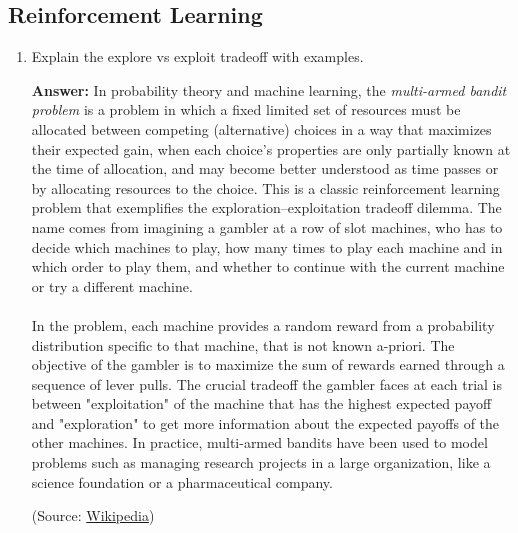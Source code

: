 \documentclass{article}
\newenvironment{QandA}{\begin{enumerate}[label=\arabic*.]}{\end{enumerate}}
\newenvironment{answer}{\par\normalfont \textbf{Answer:}}{}
\begin{document}
\subsection{Reinforcement Learning}
\begin{QandA}
    \item Explain the explore vs exploit tradeoff with examples.
    \begin{answer}
        In probability theory and machine learning, the \textit{multi-armed bandit problem} is a problem in which a fixed limited set of resources must be allocated between competing (alternative) choices in a way that maximizes their expected gain, when each choice's properties are only partially known at the time of allocation, and may become better understood as time passes or by allocating resources to the choice. This is a classic reinforcement learning problem that exemplifies the exploration–exploitation tradeoff dilemma. The name comes from imagining a gambler at a row of slot machines, who has to decide which machines to play, how many times to play each machine and in which order to play them, and whether to continue with the current machine or try a different machine.\\\\
        In the problem, each machine provides a random reward from a probability distribution specific to that machine, that is not known a-priori. The objective of the gambler is to maximize the sum of rewards earned through a sequence of lever pulls. The crucial tradeoff the gambler faces at each trial is between "exploitation" of the machine that has the highest expected payoff and "exploration" to get more information about the expected payoffs of the other machines. In practice, multi-armed bandits have been used to model problems such as managing research projects in a large organization, like a science foundation or a pharmaceutical company.
        
        (Source: \href{https://en.wikipedia.org/wiki/Multi-armed_bandit}{Wikipedia})
    \end{answer}


\end{QandA}
\end{document}
